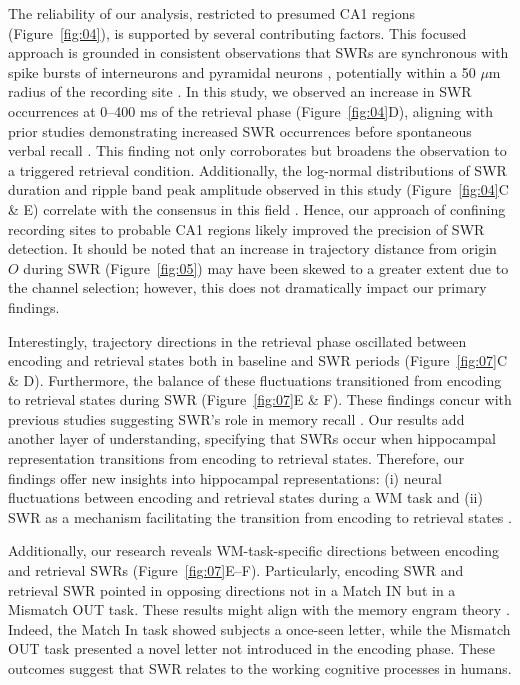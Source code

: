 \documentclass[final,3p,times,twocolumn]{elsarticle}
\begin{document}
The reliability of our analysis, restricted to presumed CA1 regions (Figure~\ref{fig:04}), is supported by several contributing factors. This focused approach is grounded in consistent observations that SWRs are synchronous with spike bursts of interneurons and pyramidal neurons \cite{buzsaki_two-stage_1989} \cite{quyen_cell_2008} \cite{royer_control_2012} \cite{hajos_input-output_2013}, potentially within a 50 $\mu$m radius of the recording site \cite{schomburg_spiking_2012}. In this study, we observed an increase in SWR occurrences at 0--400 ms of the retrieval phase (Figure~\ref{fig:04}D), aligning with prior studies demonstrating increased SWR occurrences before spontaneous verbal recall \cite{norman_hippocampal_2019} \cite{norman_hippocampal_2021}. This finding not only corroborates but broadens the observation to a triggered retrieval condition. Additionally, the log-normal distributions of SWR duration and ripple band peak amplitude observed in this study (Figure~\ref{fig:04}C & E) correlate with the consensus in this field \cite{liu_consensus_2022}. Hence, our approach of confining recording sites to probable CA1 regions likely improved the precision of SWR detection. It should be noted that an increase in trajectory distance from origin $O$ during SWR (Figure~\ref{fig:05}) may have been skewed to a greater extent due to the channel selection; however, this does not dramatically impact our primary findings.

Interestingly, trajectory directions in the retrieval phase oscillated between encoding and retrieval states both in baseline and SWR periods (Figure~\ref{fig:07}C \& D). Furthermore, the balance of these fluctuations transitioned from encoding to retrieval states during SWR (Figure~\ref{fig:07}E \& F). These findings concur with previous studies suggesting SWR's role in memory recall \cite{norman_hippocampal_2019} \cite{norman_hippocampal_2021}. Our results add another layer of understanding, specifying that SWRs occur when hippocampal representation transitions from encoding to retrieval states. Therefore, our findings offer new insights into hippocampal representations: (i) neural fluctuations between encoding and retrieval states during a WM task and (ii) SWR as a mechanism facilitating the transition from encoding to retrieval states \cite{buzsaki_hippocampal_2015}.

Additionally, our research reveals WM-task-specific directions between encoding and retrieval SWRs (Figure~\ref{fig:07}E--F). Particularly, encoding SWR and retrieval SWR pointed in opposing directions not in a Match IN but in a Mismatch OUT task. These results might align with the memory engram theory \cite{liu_optogenetic_2012}. Indeed, the Match In task showed subjects a once-seen letter, while the Mismatch OUT task presented a novel letter not introduced in the encoding phase. These outcomes suggest that SWR relates to the working cognitive processes in humans.
\end{document}
